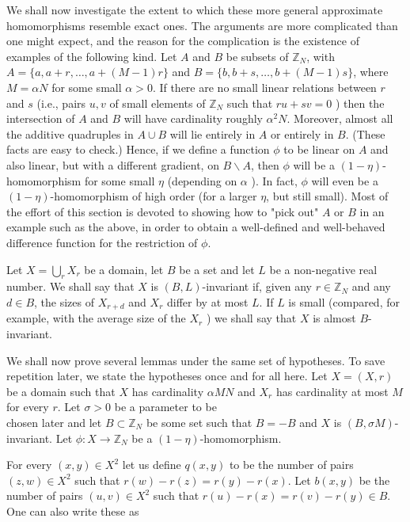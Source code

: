\documentclass[10pt]{article}
\begin{document}
We shall now investigate the extent to which these more general approximate homomorphisms resemble exact ones. The arguments are more complicated than one might expect, and the reason for the complication is the existence of examples of the following kind. Let $A$ and $B$ be subsets of $\mathbb{Z}_{N}$, with $A=\{a, a+r, \ldots, a+(M-1) r\}$ and $B=\{b, b+s, \ldots, b+(M-1) s\}$, where $M=\alpha N$ for some small $\alpha>0$. If there are no small linear relations between $r$ and $s$ (i.e., pairs $u, v$ of small elements of $\mathbb{Z}_{N}$ such that $r u+s v=0$ ) then the intersection of $A$ and $B$ will have cardinality roughly $\alpha^{2} N$. Moreover, almost all the additive quadruples in $A \cup B$ will lie entirely in $A$ or entirely in $B$. (These facts are easy to check.) Hence, if we define a function $\phi$ to be linear on $A$ and also linear, but with a different gradient, on $B \backslash A$, then $\phi$ will be a $(1-\eta)$-homomorphism for some small $\eta$ (depending on $\alpha$ ). In fact, $\phi$ will even be a $(1-\eta)$-homomorphism of high order (for a larger $\eta$, but still small). Most of the effort of this section is devoted to showing how to "pick out" $A$ or $B$ in an example such as the above, in order to obtain a well-defined and well-behaved difference function for the restriction of $\phi$.

Let $X=\bigcup_{r} X_{r}$ be a domain, let $B$ be a set and let $L$ be a non-negative real number. We shall say that $X$ is $(B, L)$-invariant if, given any $r \in \mathbb{Z}_{N}$ and any $d \in B$, the sizes of $X_{r+d}$ and $X_{r}$ differ by at most $L$. If $L$ is small (compared, for example, with the average size of the $X_{r}$ ) we shall say that $X$ is almost $B$-invariant.

We shall now prove several lemmas under the same set of hypotheses. To save repetition later, we state the hypotheses once and for all here. Let $X=(X, r)$ be a domain such that $X$ has cardinality $\alpha M N$ and $X_{r}$ has cardinality at most $M$ for every $r$. Let $\sigma>0$ be a parameter to be\\
chosen later and let $B \subset \mathbb{Z}_{N}$ be some set such that $B=-B$ and $X$ is $(B, \sigma M)$-invariant. Let $\phi: X \rightarrow \mathbb{Z}_{N}$ be a $(1-\eta)$-homomorphism.

For every $(x, y) \in X^{2}$ let us define $q(x, y)$ to be the number of pairs $(z, w) \in X^{2}$ such that $r(w)-r(z)=r(y)-r(x)$. Let $b(x, y)$ be the number of pairs $(u, v) \in X^{2}$ such that $r(u)-r(x)=r(v)-r(y) \in B$. One can also write these as
\end{document}
